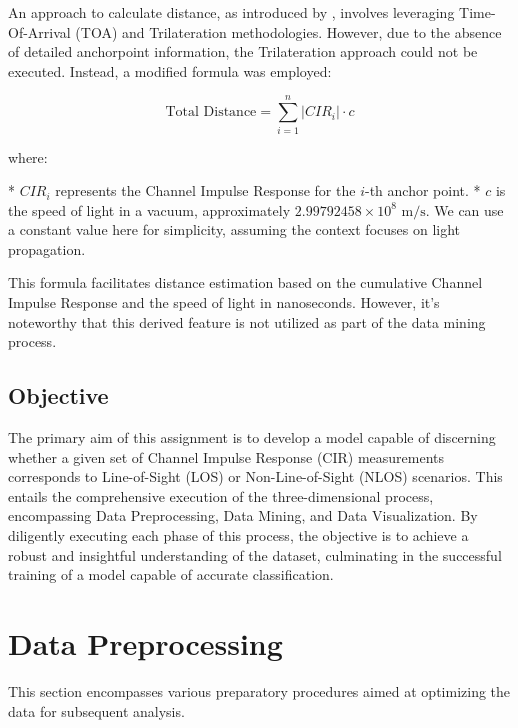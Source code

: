 \documentclass[
	a4paper, %
	11pt, %
]{CSUniSchoolLabReport}
\begin{document}
An approach to calculate distance, as introduced by \cite{che_feature-based_2021}, involves leveraging Time-Of-Arrival (TOA) and Trilateration methodologies. However, due to the absence of detailed anchorpoint information, the Trilateration approach could not be executed. Instead, a modified formula was employed:


\begin{equation}
\text{Total Distance} = \sum_{i=1}^{n} |CIR_i| \cdot c
\end{equation}

where:

* $CIR_i$ represents the Channel Impulse Response for the $i$-th anchor point.
* $c$ is the speed of light in a vacuum, approximately $2.99792458 \times 10^8 \text{ m/s}$. We can use a constant value here for simplicity, assuming the context focuses on light propagation.


This formula facilitates distance estimation based on the cumulative Channel Impulse Response and the speed of light in nanoseconds. However, it's noteworthy that this derived feature is not utilized as part of the data mining process.



\subsection{Objective}\label{objective}

The primary aim of this assignment is to develop a model capable of discerning whether a given set of Channel Impulse Response (CIR) measurements corresponds to Line-of-Sight (LOS) or Non-Line-of-Sight (NLOS) scenarios. This entails the comprehensive execution of the three-dimensional process, encompassing Data Preprocessing, Data Mining, and Data Visualization. By diligently executing each phase of this process, the objective is to achieve a robust and insightful understanding of the dataset, culminating in the successful training of a model capable of accurate classification.


\section{Data Preprocessing}\label{data_preprocessing}

This section encompasses various preparatory procedures aimed at optimizing the data for subsequent analysis.
\end{document}
